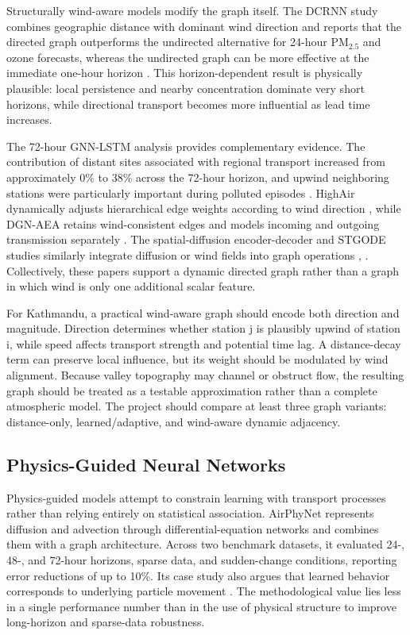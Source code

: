 Structurally wind-aware models modify the graph itself. The DCRNN study combines geographic distance with dominant wind direction and reports that the directed graph outperforms the undirected alternative for 24-hour PM$_{2.5}$ and ozone forecasts, whereas the undirected graph can be more effective at the immediate one-hour horizon \cite{ref14}. This horizon-dependent result is physically plausible: local persistence and nearby concentration dominate very short horizons, while directional transport becomes more influential as lead time increases.

The 72-hour GNN-LSTM analysis provides complementary evidence. The contribution of distant sites associated with regional transport increased from approximately 0\% to 38\% across the 72-hour horizon, and upwind neighboring stations were particularly important during polluted episodes \cite{ref15}. HighAir dynamically adjusts hierarchical edge weights according to wind direction \cite{ref25}, while DGN-AEA retains wind-consistent edges and models incoming and outgoing transmission separately \cite{ref17}. The spatial-diffusion encoder-decoder and STGODE studies similarly integrate diffusion or wind fields into graph operations \cite{ref22}, \cite{ref23}. Collectively, these papers support a dynamic directed graph rather than a graph in which wind is only one additional scalar feature.

For Kathmandu, a practical wind-aware graph should encode both direction and magnitude. Direction determines whether station j is plausibly upwind of station i, while speed affects transport strength and potential time lag. A distance-decay term can preserve local influence, but its weight should be modulated by wind alignment. Because valley topography may channel or obstruct flow, the resulting graph should be treated as a testable approximation rather than a complete atmospheric model. The project should compare at least three graph variants: distance-only, learned/adaptive, and wind-aware dynamic adjacency.

\subsection{Physics-Guided Neural Networks}

Physics-guided models attempt to constrain learning with transport processes rather than relying entirely on statistical association. AirPhyNet represents diffusion and advection through differential-equation networks and combines them with a graph architecture. Across two benchmark datasets, it evaluated 24-, 48-, and 72-hour horizons, sparse data, and sudden-change conditions, reporting error reductions of up to 10\%. Its case study also argues that learned behavior corresponds to underlying particle movement \cite{ref24}. The methodological value lies less in a single performance number than in the use of physical structure to improve long-horizon and sparse-data robustness.

